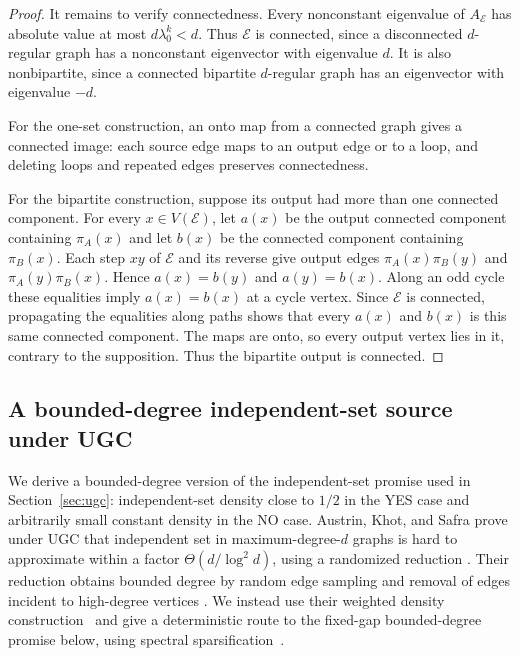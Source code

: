 \begin{proof}
It remains to verify connectedness. Every nonconstant eigenvalue of
$A_{\mathcal E}$ has absolute value at most $d\lambda_0^k<d$.
Thus $\mathcal E$ is connected, since a disconnected $d$-regular
graph has a nonconstant eigenvector with eigenvalue $d$. It is also
nonbipartite, since a connected bipartite $d$-regular graph has an
eigenvector with eigenvalue $-d$.

For the one-set construction, an onto map from a connected graph
gives a connected image: each source edge maps to an output edge or
to a loop, and deleting loops and repeated edges preserves
connectedness.

For the bipartite construction, suppose its output had more than one
connected component. For every $x\in V(\mathcal E)$, let $a(x)$ be the output
connected component containing $\pi_A(x)$ and let $b(x)$ be the connected component
containing $\pi_B(x)$. Each step $xy$ of $\mathcal E$ and its reverse
give output edges $\pi_A(x)\pi_B(y)$ and
$\pi_A(y)\pi_B(x)$. Hence $a(x)=b(y)$ and $a(y)=b(x)$.
Along an odd cycle these equalities imply $a(x)=b(x)$ at a cycle
vertex. Since $\mathcal E$ is connected, propagating the equalities
along paths shows that every $a(x)$ and $b(x)$ is this same
connected component. The maps are onto, so every output vertex lies in it,
contrary to the supposition. Thus the bipartite output is connected.
\end{proof}

\subsection{A bounded-degree independent-set source under \textup{UGC}}
\label{sec:bounded-degree-ugc-source}

We derive a bounded-degree version of the independent-set promise
used in Section~\ref{sec:ugc}: independent-set density close to
$1/2$ in the YES case and arbitrarily small constant density in
the NO case. Austrin, Khot, and Safra prove under \textup{UGC} that independent
set in maximum-degree-$d$ graphs is hard to approximate within a factor
$\Theta(d/\log^2 d)$, using a randomized reduction
\cite[Theorem~1.2 and Section~5.2]{AKS2011}. Their reduction obtains
bounded degree by random edge sampling and removal of edges incident
to high-degree vertices
\cite[Section~4, Steps~2--3]{AKS2011}. We instead use their weighted
density construction~\cite[Theorem~3.1]{AKS2011} and give a
deterministic route to the fixed-gap bounded-degree promise below,
using spectral sparsification~\cite[Theorem~1.1]{BSS2012}.

